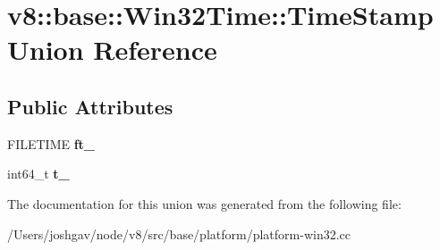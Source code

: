 \hypertarget{unionv8_1_1base_1_1_win32_time_1_1_time_stamp}{}\section{v8\+:\+:base\+:\+:Win32\+Time\+:\+:Time\+Stamp Union Reference}
\label{unionv8_1_1base_1_1_win32_time_1_1_time_stamp}
\subsection*{Public Attributes}
\begin{DoxyCompactItemize}
\item 
F\+I\+L\+E\+T\+I\+ME {\bfseries ft\+\_\+}\hypertarget{unionv8_1_1base_1_1_win32_time_1_1_time_stamp_ad995e225faaaceebb76ca77f5412d64a}{}\label{unionv8_1_1base_1_1_win32_time_1_1_time_stamp_ad995e225faaaceebb76ca77f5412d64a}

\item 
int64\+\_\+t {\bfseries t\+\_\+}\hypertarget{unionv8_1_1base_1_1_win32_time_1_1_time_stamp_a63e26198f9ff43a55e173dbf4daddd21}{}\label{unionv8_1_1base_1_1_win32_time_1_1_time_stamp_a63e26198f9ff43a55e173dbf4daddd21}

\end{DoxyCompactItemize}


The documentation for this union was generated from the following file\+:\begin{DoxyCompactItemize}
\item 
/\+Users/joshgav/node/v8/src/base/platform/platform-\/win32.\+cc\end{DoxyCompactItemize}
